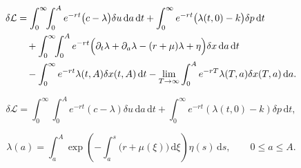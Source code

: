 \documentclass[10pt,a4paper]{amsart}
\newcommand{\dd}{\,\mathrm{d}}
\begin{document}
\begin{align}
\delta\mathcal L
&=\int_0^\infty\!\!\int_0^A e^{-rt}\bigl(c-\lambda\bigr)\delta u\dd a\dd t
+\int_0^\infty e^{-rt}\bigl(\lambda(t,0)-k\bigr)\delta p\dd t
\notag\\
&\quad+\int_0^\infty\!\!\int_0^A e^{-rt}
\Bigl(\partial_t\lambda+\partial_a\lambda-(r+\mu)\lambda+\eta\Bigr)
\delta x\dd a\dd t
\notag\\
&\quad-\int_0^\infty e^{-rt}\lambda(t,A)\delta x(t,A)\dd t
-\lim_{T\to\infty}\int_0^A e^{-rT}\lambda(T,a)\delta x(T,a)\dd a.
\label{eq:pf_deltaL_3}
\end{align}

\begin{equation}\label{eq:pf_deltaL_reduced}
\delta\mathcal L=\int_0^\infty\!\!\int_0^A e^{-rt}(c-\lambda)\delta u\dd a\dd t
+\int_0^\infty e^{-rt}(\lambda(t,0)-k)\delta p\dd t,
\end{equation}

\begin{equation}\label{eq:auto_adjoint_formula}
\lambda(a)=\int_a^A\exp\!\left(-\int_a^s\bigl(r+\mu(\xi)\bigr)\dd\xi\right)
\eta(s)\dd s,\qquad 0\le a\le A.
\end{equation}
\end{document}
